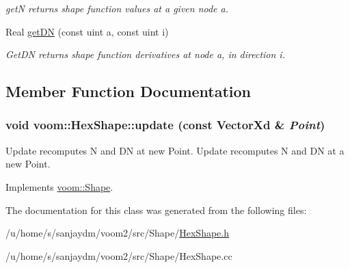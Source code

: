 \begin{DoxyCompactItemize}
\begin{DoxyCompactList}\small\item\em getN returns shape function values at a given node a. \item\end{DoxyCompactList}\item 
\hypertarget{classvoom_1_1_hex_shape_afdb11f3450c7b92608bbe8332961032d}{
Real \hyperlink{classvoom_1_1_hex_shape_afdb11f3450c7b92608bbe8332961032d}{getDN} (const uint a, const uint i)}
\label{classvoom_1_1_hex_shape_afdb11f3450c7b92608bbe8332961032d}

\begin{DoxyCompactList}\small\item\em GetDN returns shape function derivatives at node a, in direction i. \item\end{DoxyCompactList}\end{DoxyCompactItemize}


\subsection{Member Function Documentation}
\hypertarget{classvoom_1_1_hex_shape_a62e0194dcc933cede6fcde41e9cfcd1f}{
\subsubsection[{update}]{\setlength{\rightskip}{0pt plus 5cm}void voom::HexShape::update (const VectorXd \& {\em Point})}}
\label{classvoom_1_1_hex_shape_a62e0194dcc933cede6fcde41e9cfcd1f}


Update recomputes N and DN at new Point. Update recomputes N and DN at a new Point. 

Implements \hyperlink{classvoom_1_1_shape_a8ded544de12647543b056cec61be9f26}{voom::Shape}.

The documentation for this class was generated from the following files:\begin{DoxyCompactItemize}
\item 
/u/home/s/sanjaydm/voom2/src/Shape/\hyperlink{_hex_shape_8h}{HexShape.h}\item 
/u/home/s/sanjaydm/voom2/src/Shape/HexShape.cc\end{DoxyCompactItemize}
